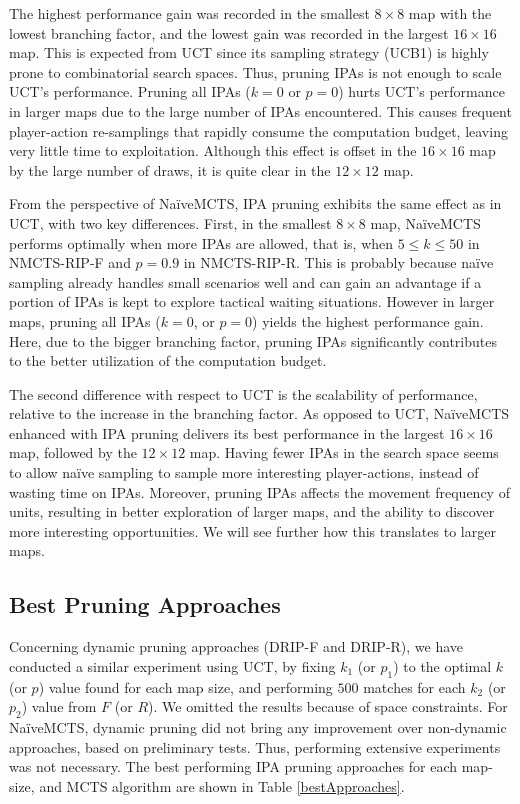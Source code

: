 \documentclass[conference]{IEEEtran}
\begin{document}
The highest performance gain was recorded in the smallest $8\times8$ map with the lowest branching factor, and the lowest gain was recorded in the largest $16\times16$ map. This is expected from UCT since its sampling strategy (UCB1) is highly prone to combinatorial search spaces. Thus, pruning IPAs is not enough to scale UCT's performance. Pruning all IPAs ($k = 0$ or $p = 0$) hurts UCT's performance in larger maps due to the large number of IPAs encountered. This causes frequent player-action re-samplings that rapidly consume the computation budget, leaving very little time to exploitation. Although this effect is offset in the $16\times16$ map by the large number of draws, it is quite clear in the $12\times12$ map.

From the perspective of NaïveMCTS, IPA pruning exhibits the same effect as in UCT, with two key differences. First, in the smallest $8\times8$ map, NaïveMCTS performs optimally when more IPAs are allowed, that is, when $5 \leq k \leq 50$ in NMCTS-RIP-F and $p=0.9$ in NMCTS-RIP-R. This is probably because naïve sampling already handles small scenarios well and can gain an advantage if a portion of IPAs is kept to explore tactical waiting situations. However in larger maps, pruning all IPAs ($k = 0$, or $p = 0$) yields the highest performance gain. Here, due to the bigger branching factor, pruning IPAs significantly contributes to the better utilization of the computation budget.

The second difference with respect to UCT is the scalability of performance, relative to the increase in the branching factor. As opposed to UCT, NaïveMCTS enhanced with IPA pruning delivers its best performance in the largest $16\times16$ map, followed by the $12\times12$ map. Having fewer IPAs in the search space seems to allow naïve sampling to sample more interesting player-actions, instead of wasting time on IPAs. Moreover, pruning IPAs affects the movement frequency of units, resulting in better exploration of larger maps, and the ability to discover more interesting opportunities. We will see further how this translates to larger maps.


\subsection{Best Pruning Approaches}

Concerning dynamic pruning approaches (DRIP-F and DRIP-R), we have conducted a similar experiment using UCT, by fixing $k_1$ (or $p_1$) to the optimal $k$ (or $p$) value found for each map size, and performing $500$ matches for each $k_2$ (or $p_2$) value from $F$ (or $R$). We omitted the results because of space constraints. For NaïveMCTS, dynamic pruning did not bring any improvement over non-dynamic approaches, based on preliminary tests. Thus, performing extensive experiments was not necessary. The best performing IPA pruning approaches for each map-size, and MCTS algorithm are shown in Table \ref{bestApproaches}.
\end{document}
